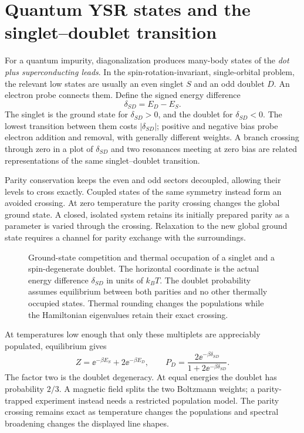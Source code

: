 \section{Quantum YSR states and the singlet--doublet transition}

For a quantum impurity, diagonalization produces many-body states of the
\emph{dot plus superconducting leads}. In the spin-rotation-invariant,
single-orbital problem, the relevant low states are usually an even singlet $S$
and an odd doublet $D$. An electron probe connects them. Define the signed
energy difference
\begin{equation}\label{eq:sd-energy}
 \delta_{SD}=E_D-E_S.
\end{equation}
The singlet is the ground state for $\delta_{SD}>0$, and the doublet for
$\delta_{SD}<0$. The lowest transition between them costs $|\delta_{SD}|$;
positive and negative bias probe electron addition and removal, with generally
different weights. A branch crossing through zero in a plot of $\delta_{SD}$
and two resonances meeting at zero bias are related representations of the
same singlet--doublet transition.

Parity conservation keeps the even and odd sectors decoupled, allowing their
levels to cross exactly. Coupled states of the same symmetry instead form an
avoided crossing. At zero temperature the parity crossing changes the global
ground state. A closed, isolated system retains its initially prepared parity
as a parameter is varied through the crossing. Relaxation to the new global ground state requires a channel for
parity exchange with the surroundings.

\begin{figure}[htb]
\centering{}
\caption{Ground-state competition and thermal occupation of a singlet and a
spin-degenerate doublet. The horizontal coordinate is the actual energy difference
$\delta_{SD}$ in units of $k_BT$. The doublet
probability assumes equilibrium between both parities and no other thermally
occupied states. Thermal rounding changes the populations while the
Hamiltonian eigenvalues retain their exact crossing.}
\label{fig:primer-thermal}
\end{figure}

At temperatures low enough that only these multiplets are appreciably populated, equilibrium gives
\begin{equation}\label{eq:doublet-probability}
 Z=\ee^{-\beta E_S}+2\ee^{-\beta E_D},\qquad
 P_D=\frac{2\ee^{-\beta\delta_{SD}}}{1+2\ee^{-\beta\delta_{SD}}}.
\end{equation}
The factor two is the doublet degeneracy. At equal energies the doublet has
probability $2/3$. A magnetic field splits the two Boltzmann weights;
a parity-trapped experiment instead needs a restricted population model. The
parity crossing remains exact as temperature changes the populations and
spectral broadening changes the displayed line shapes.

